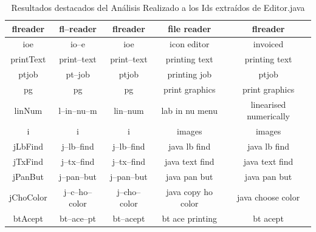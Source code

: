 \begin{table}
\begin{tabular}{| c | c | c | c | c |}
flreader&fl--reader&flreader&file reader&flreader\\ \hline
ioe&io--e&ioe&icon editor&invoiced\\ \hline
printText&print--text&print--text&printing text&printing text\\ \hline
ptjob&pt--job&ptjob&printing job&ptjob\\ \hline
pg&pg&pg&print graphics&print graphics\\ \hline
linNum&l--in--nu--m&lin--num&lab in nu menu&linearised numerically\\ \hline
i&i&i&images&images\\ \hline
jLbFind&j--lb--find&j--lb--find&java lb find&java lb find\\ \hline
jTxFind&j--tx--find&j--tx--find&java text find&java text find\\ \hline
jPanBut&j--pan--but&j--pan--but&java pan but&java pan but\\ \hline
jChoColor&j--c--ho--color&j--cho--color&java copy ho color&java choose color\\ \hline
btAcept&bt--ace--pt&bt--acept&bt ace printing&bt acept\\ \hline

  \end{tabular}
	 
   \caption{Resultados destacados del Análisis Realizado a los Ids extraídos de Editor.java}
   \label{tabla6}
     
\end{table}

\clearpage %

